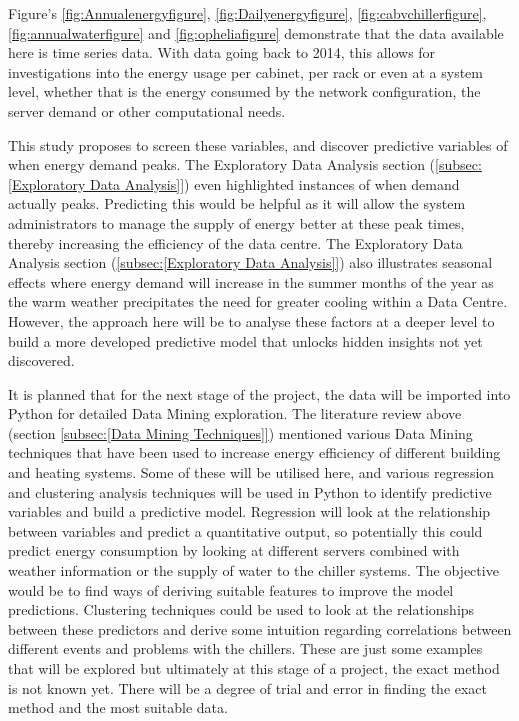\documentclass[12pt]{scrartcl}
\begin{document}
Figure's \ref{fig:Annualenergyfigure}, \ref{fig:Dailyenergyfigure}, \ref{fig:cabvchillerfigure}, \ref{fig:annualwaterfigure} and \ref{fig:opheliafigure} demonstrate that the data available here is time series data. With data going back to 2014, this allows for investigations into the energy usage per cabinet, per rack or even at a system level, whether that is the energy consumed by the network configuration, the server demand or other computational needs. 

This study proposes to screen these variables, and discover predictive variables of when energy demand peaks. The Exploratory Data Analysis section (\ref{subsec:[Exploratory Data Analysis]}) even highlighted instances of when demand actually peaks. Predicting this would be helpful as it will allow the system administrators to manage the supply of energy better at these peak times, thereby increasing the efficiency of the data centre. The Exploratory Data Analysis section (\ref{subsec:[Exploratory Data Analysis]}) also illustrates  seasonal effects where energy demand will increase in the summer months of the year as the warm weather precipitates the need for greater cooling within a Data Centre. However, the approach here will be to analyse these factors at a deeper level to build a more developed predictive model that unlocks hidden insights not yet discovered.

It is planned that for the next stage of the project, the data will be imported into Python for detailed Data Mining exploration. The literature review above (section \ref{subsec:[Data Mining Techniques]}) mentioned various Data Mining techniques that have been used to increase energy efficiency of different building and heating systems. Some of these will be utilised here, and various regression and clustering analysis techniques will be used in Python to identify predictive variables and build a predictive model. Regression will look at the relationship between variables and predict a quantitative output, so potentially this could predict energy consumption by looking at different servers combined with weather information or the supply of water to the chiller systems. The objective would be to find ways of deriving suitable features to improve the model predictions. Clustering techniques could be used to look at the relationships between these predictors and derive some  intuition regarding correlations between different events and problems with the chillers. These are just some examples that will be explored but ultimately at this stage of a project, the exact method is not known yet. There will be a degree of trial and error in finding the exact method and the most suitable data. 
\end{document}
